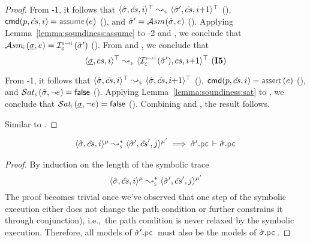 \begin{proof}
\noindent {}
From \hyp{1}, it follows that $\abssemrule{\sstate, \scs, i}{\sstate', \scs, i{+}1}{\top}{\top}{\symbolic}$ (), 
$\ccmd[\prog][\scs]{i}  = \assume(\jsilexpr)$ (), and $\hat{\sigma}' = \mathcal{A}{sm}_{}(\hat{\sigma}, e)$ (). 
Applying Lemma~\ref{lemma:soundiness:assume} to 
\hyp{2} and , we conclude that 
$\absassume{\instrumented}(\istate, \jsilexpr) = \interpret{\symbinst}{\senv}(\sstate')$ (). 
From  and , we conclude that 
 $$\abssemrule{\istate, \cs, i}{\interpret{\symbinst}{\senv}(\sstate'), \cs, i{+}1}{\top}{\top}{\symbolic} \text{ (\ieq{5})}$$
 \vspace{5pt}

\noindent {}
From \hyp{1}, it follows that $\abssemrule{\sstate, \scs, i}{\sstate, \scs, i{+}1}{\top}{\top}{\symbolic}$ (), 
$ \ccmd[\prog][\scs]{i}  = \jassert(\jsilexpr)$ (), and $\abssat{\symbolic}(\sstate, \neg \jsilexpr) = \jfalse$ (). 
Applying Lemma~\ref{lemma:soundiness:sat} to , we conclude that 
$\abssat{\instrumented}(\istate, \neg \jsilexpr) = \jfalse$ (). 
Combining  and , the result follows. 
 \vspace{5pt}
 
\noindent {}
Similar to . 
 \vspace{5pt} 
\end{proof}


\begin{lemma}\label{lemma:pc:monotonocity}
$$
\begin{array}{l}
\transabssemrule{\sstate, \scs, i}{\sstate', \scs', j}{\mode}{\mode'}{\symbolic} 
    \implies \sstate'.\pcsel \vdash \sstate.\pcsel
\end{array}
$$
\end{lemma}
\begin{proof}
By induction on the length of the symbolic trace 
$$\transabssemrule{\sstate, \scs, i}{\sstate', \scs', j}{\mode}{\mode'}{\symbolic}$$
The proof becomes trivial once we've observed that one step of the symbolic execution either does not change the path condition or further constrains it through conjunction), i.e.,~the path condition is never relaxed by the symbolic execution. Therefore, all models of $\sstate'.\pcsel$ must also be the models of $\sstate.\pcsel$.
\end{proof}


